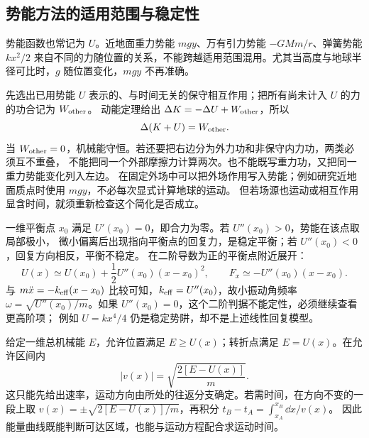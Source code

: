 {\subsection{势能方法的适用范围与稳定性}

势能函数也常记为 $U$。近地面重力势能 $mgy$、万有引力势能 $-GMm/r$、弹簧势能 $kx^2/2$
来自不同的力随位置的关系，不能跨越适用范围混用。尤其当高度与地球半径可比时，$g$ 随位置变化，$mgy$ 不再准确。

先选出已用势能 $U$ 表示的、与时间无关的保守相互作用；把所有尚未计入 $U$ 的力的功合记为 $W_{\rm other}$。
动能定理给出 $\Delta K=-\Delta U+W_{\rm other}$，所以
\begin{equation}
 \Delta(K+U)=W_{\rm other}.
 \label{ch08:eq:other-work}
\end{equation}
当 $W_{\rm other}=0$，机械能守恒。若还要把右边分为外力功和非保守内力功，两类必须互不重叠，
不能把同一个外部摩擦力计算两次。也不能既写重力功，又把同一重力势能变化列入左边。
在固定外场中可以把外场作用写入势能；例如研究近地面质点时使用 $mgy$，不必每次显式计算地球的运动。
但若场源也运动或相互作用显含时间，就须重新检查这个简化是否成立。

一维平衡点 $x_0$ 满足 $U'(x_0)=0$，即合力为零。若 $U''(x_0)>0$，势能在该点取局部极小，
微小偏离后出现指向平衡点的回复力，是稳定平衡；若 $U''(x_0)<0$，回复方向相反，平衡不稳定。
在二阶导数为正的平衡点附近展开：
\[
 U(x)\simeq U(x_0)+\frac12U''(x_0)(x-x_0)^2,
 \qquad F_x\simeq-U''(x_0)(x-x_0).
\]
与 $m\ddot x=-k_{\rm eff}(x-x_0)$ 比较可知，$k_{\rm eff}=U''(x_0)$，故小振动角频率
$\omega=\sqrt{U''(x_0)/m}$。如果 $U''(x_0)=0$，这个二阶判据不能定性，必须继续查看更高阶项；
例如 $U=kx^4/4$ 仍是稳定势阱，却不是上述线性回复模型。

给定一维总机械能 $E$，允许位置满足 $E\ge U(x)$；转折点满足 $E=U(x)$。在允许区间内
\[
 |v(x)|=\sqrt{\frac{2[E-U(x)]}{m}}.
\]
这只能先给出速率，运动方向由所处的往返分支确定。若需时间，在方向不变的一段上取
$v(x)=\pm\sqrt{2[E-U(x)]/m}$，再积分 $t_B-t_A=\int_{x_A}^{x_B}\dd x/v(x)$。
因此能量曲线既能判断可达区域，也能与运动方程配合求运动时间。
}

